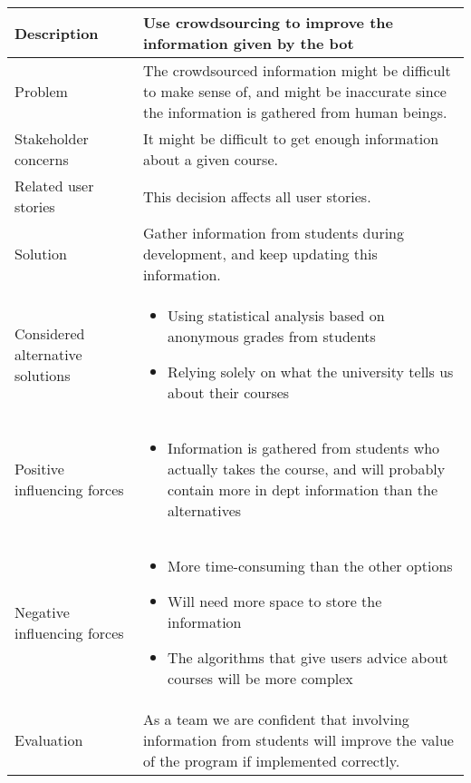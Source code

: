 \documentclass[pdftex, 10pt, norsk, a4paper, twoside]{article}
\numberwithin{equation}{section}
\numberwithin{figure}{section}
\numberwithin{table}{section}
\begin{document}
\begin{center} %

\hfill

\newpage

\hfill 
\section*{}

\begin{tabular}{| >{\centering\arraybackslash} m{4cm} | m{9cm} | } 
\hline
Description & Use crowdsourcing to improve the information given by the bot \\
\hline
Problem & The crowdsourced information might be difficult to make sense of, and might be inaccurate since the information is gathered from human beings. \\
\hline
Stakeholder concerns & It might be difficult to get enough information about a given course. \\
\hline
Related user stories & This decision affects all user stories. \\
\hline
Solution & Gather information from students during development, and keep updating this information. \\
\hline
Considered alternative solutions &
\begin{itemize}
    \item Using statistical analysis based on anonymous grades from students
    \item Relying solely on what the university tells us about their courses
\end{itemize} \\
\hline
Positive influencing forces &
\begin{itemize}
    \item Information is gathered from students who actually takes the course, and will probably contain more in dept information than the alternatives
\end{itemize} \\
\hline
Negative influencing forces &
\begin{itemize}
    \item More time-consuming than the other options
    \item Will need more space to store the information
    \item The algorithms that give users advice about courses will be more complex
\end{itemize} \\
\hline
Evaluation & As a team we are confident that involving information from students will improve the value of the program if implemented correctly. \\
\hline
\end{tabular}
\end{center}  %
\end{document}

